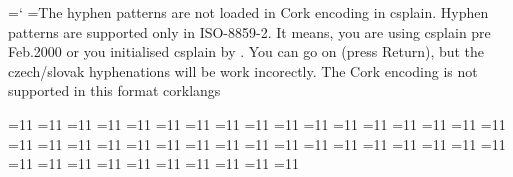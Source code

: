 %


\let\corkencoded\font %

\ifx\czCork\undefined 
  {\newlinechar=`^^J
   \errhelp={The hyphen patterns are not loaded in Cork encoding in csplain.^^J
            Hyphen patterns are supported only in ISO-8859-2.^^J
            It means, you are using csplain pre Feb.2000 or^^J
            you initialised csplain by \let\Cork=\relax.^^J
            You can go on (press Return), but the czech/slovak^^J
            hyphenations will be work incorectly.}
  \errmessage
  {The Cork encoding is not supported in this format} %
  } 
\else
  \csname corklangs\endcsname
\fi

=11  %
=11  %
=11  %
=11  %
=11  %
=11  %
=11  %
=11  %
=11  %
=11  %
=11  %
=11  %
=11  %
=11  %
=11  %
=11  %
=11  %
=11  %
=11  %
=11  %
=11  %
=11  %
=11  %
=11  %
=11  %
=11  %
=11  %
=11  %
=11  %
=11  %
=11  %
=11  %
=11  %
=11  %
=11  %
=11  %
=11  %
=11  %
=11  %
=11  %
=11  %
=11  %
=11  %
=11  %
		
